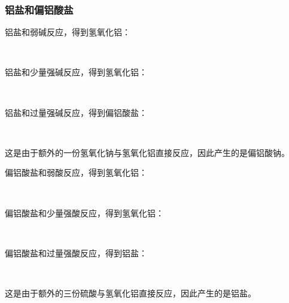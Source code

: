 \documentclass[UTF8]{ctexart}
\begin{document}
\subsubsection{铝盐和偏铝酸盐}
    铝盐和弱碱反应，得到氢氧化铝：
    \begin{center}
        \\[3mm]
    \end{center}
    铝盐和少量强碱反应，得到氢氧化铝：
    \begin{center}
        \\[3mm]
    \end{center}
    铝盐和过量强碱反应，得到偏铝酸盐：
    \begin{center}
        \\[3mm]
    \end{center}
    这是由于额外的一份氢氧化钠与氢氧化铝直接反应，因此产生的是偏铝酸钠。

\newpage

    偏铝酸盐和弱酸反应，得到氢氧化铝：
    \begin{center}
        \\[3mm]
    \end{center}
    偏铝酸盐和少量强酸反应，得到氢氧化铝：
    \begin{center}
        \\[3mm]
    \end{center}
    偏铝酸盐和过量强酸反应，得到铝盐：
    \begin{center}
        \\[3mm]
    \end{center}
    这是由于额外的三份硫酸与氢氧化铝直接反应，因此产生的是铝盐。\\
\end{document}
